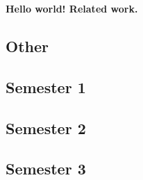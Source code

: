 \documentclass[../../main]{subfiles}
\begin{document}
\textbf{Hello world! Related work.}

\subsection{Other}

\newpage

\subsection{Semester 1}

\newpage

\subsection{Semester 2}

\newpage

\subsection{Semester 3}

\newpage
\end{document}
